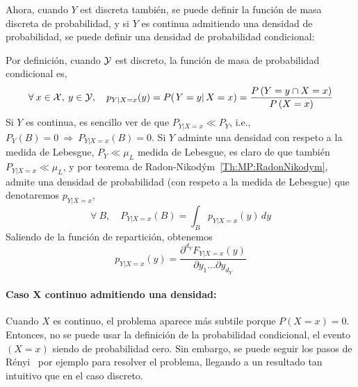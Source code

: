 {Ahora, cuando $Y$ est discreta tambi\'en,  se puede definir la funci\'on de masa
discreta  de probabilidad,  y  si $Y$  es  continua admitiendo  una densidad  de
probabilidad, se puede definir una densidad de probabilidad condicional:
%
\begin{definicion}
  Por  definici\'on,  cuando  $\mathcal{Y}$  est   discreto,  la  funci\'on  de  masa  de
  probabilidad condicional es,
  \[
  \forall \:  x \in  \mathcal{X}, \: y  \in \mathcal{Y}, \quad  p_{Y|X=x}(y) =  P( \left. Y  = y
  \right|  X =  x  ) =  \frac{P\left(Y  = y  \cap X  =  x \right)}{P\left(X  =
      x\right)}
  \]
  Si $Y$ es continua, es sencillo  ver de que $P_{Y|X=x} \ll P_Y$, i.e., $P_Y(B)
  = 0  \: \Rightarrow  \: P_{Y|X=x}(B) =  0$.  Si  $Y$ adminte una  densidad con
  respeto a la medida de Lebesgue,  $P_Y \ll \mu_L$ medida de Lebesgue, es claro
  de    que   tambi\'en   $P_{Y|X=x}    \ll   \mu_L$,    y   por    teorema   de
  Radon-Nikod\'ym~\ref{Th:MP:RadonNikodym}, admite  una densidad de probabilidad
  (con respeto a la medida de Lebesgue) que denotaremos $p_{Y|X=x}$,
  \[
  \forall \: B, \quad P_{Y|X=x}(B) = \int_B p_{Y|X=x}(y) \, dy
  \]
  Saliendo de la funci\'on de repartici\'on, obtenemos
  \[
  p_{Y|X=x}(y) = \frac{\partial^{d_Y} F_{Y|X=x}(y)}{\partial y_1 \ldots \partial
    y_{d_Y}}
  \]
\end{definicion}



\paragraph{Caso $\boldsymbol{X}$ continuo admitiendo una densidad:}
Cuando  $X$ es  continuo, el  problema aparece  m\'as subtile  porque  $P(X=x) =
0$. Entonces, no  se puede usar la definici\'on  de la probabilidad condicional,
el evento $(X=x)$ siendo de probabilidad cero.  Sin embargo, se puede seguir los
pasos  de  R\'enyi~\cite[Cap.~5]{Ren} por  ejemplo  para  resolver el  problema,
llegando a un resultado tan intuitivo que en el caso discreto.

}
